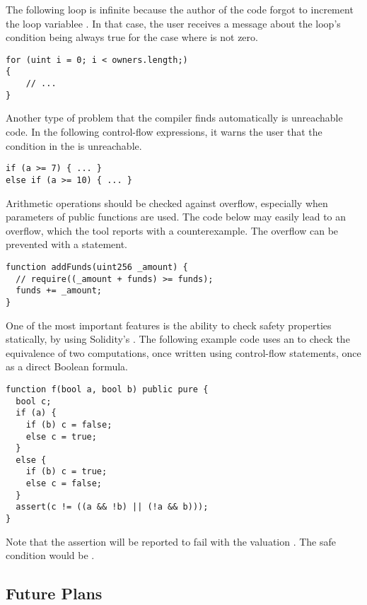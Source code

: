 The following loop is infinite because the author of the code
forgot to increment the loop variablee .
%
In that case, the user receives a message about the loop's condition being
always true for the case where  is not zero.

\begin{verbatim}
for (uint i = 0; i < owners.length;)
{
    // ...
}
\end{verbatim}

Another type of problem that the compiler finds automatically is unreachable
code.
%
In the following control-flow expressions, it warns the user that the condition
in the  is unreachable.

\begin{verbatim}
if (a >= 7) { ... }
else if (a >= 10) { ... }
\end{verbatim}

Arithmetic operations should be checked against overflow, especially when
parameters of public functions are used.
%
The code below may easily lead to an overflow, which the tool reports with a
counterexample.
%
The overflow can be prevented with a  statement.

\begin{verbatim}
function addFunds(uint256 _amount) {
  // require((_amount + funds) >= funds);
  funds += _amount;
}
\end{verbatim}

One of the most important features is the ability to check safety properties
statically, by using Solidity's .
%
The following example code uses an  to check the equivalence of
two computations, once written using control-flow statements, once as a direct
Boolean formula.

\begin{verbatim}
function f(bool a, bool b) public pure {
  bool c;
  if (a) {
    if (b) c = false;
    else c = true;
  }
  else {
    if (b) c = true;
    else c = false;
  }
  assert(c != ((a && !b) || (!a && b)));
}
\end{verbatim}

Note that the assertion will be reported to fail with the valuation
.
%
The safe condition would be
.

\subsection{Future Plans}

